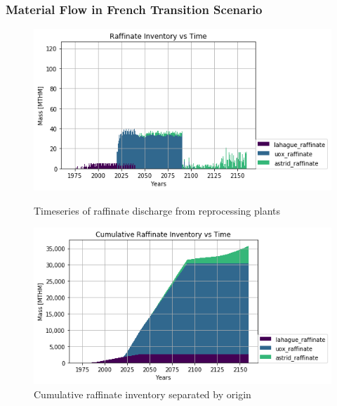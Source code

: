 \begin{frame}
	\frametitle{Material Flow in French Transition Scenario}
	
\begin{figure}[htbp!]
\begin{minipage}[b]{.45\linewidth}
	\begin{center}
		\includegraphics[width=\textwidth]{./images/french-transition/raffinate.png}
	\end{center}
	\caption{Timeseries of raffinate discharge from reprocessing plants}
	\label{fig:fuel}
\end{minipage}
\hspace{.5cm}
\begin{minipage}[b]{.45\linewidth}
	\centering
		\includegraphics[width=\linewidth]{./images/french-transition/raffinate_cum.png}
	\caption{Cumulative raffinate inventory separated by origin}
	\label{fig:pu_no_cum}
\end{minipage}
\end{figure}

\end{frame}